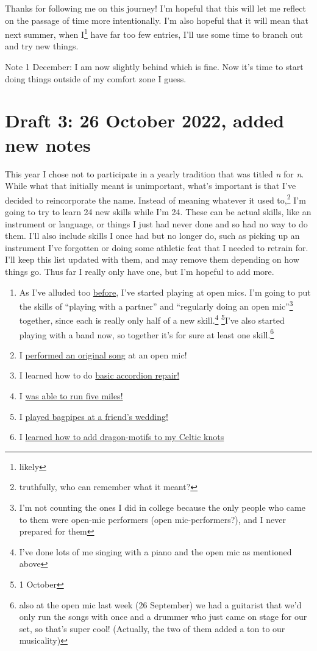 \documentclass[12pt]{article}[titlepage]
\newcommand{\say}[1]{``#1''}
\newcommand{\1}{\={a}}
\newcommand{\2}{\={e}}
\newcommand{\3}{\={\i}}
\newcommand{\4}{\=o}
\newcommand{\5}{\=u}
\newcommand{\6}{\={A}}
\renewcommand{\,}{\textsuperscript{,}}
\begin{document}
Thanks for following me on this journey!
I'm hopeful that this will let me reflect on the passage of time more intentionally.
I'm also hopeful that it will mean that next summer, when I\footnote{likely} have far too few entries, I'll use some time to branch out and try new things.

Note 1 December: I am now slightly behind which is fine.
Now it's time to start doing things outside of my comfort zone I guess.


\section{Draft 3: 26 October 2022, added new notes}
This year I chose not to participate in a yearly tradition that was titled \textit{n} for \textit{n}.
While what that initially meant is unimportant, what's important is that I've decided to reincorporate the name.
Instead of meaning whatever it used to,\footnote{truthfully, who can remember what it meant?} I'm going to try to learn 24 new skills while I'm 24.
These can be actual skills, like an instrument or language, or things I just had never done and so had no way to do them.
I'll also include skills I once had but no longer do, such as picking up an instrument I've forgotten or doing some athletic feat that I needed to retrain for.
I'll keep this list updated with them, and may remove them depending on how things go.
Thus far I really only have one, but I'm hopeful to add more.

\begin{enumerate}
\item As I've alluded too \href{open-mic-2.html}{before}, I've started playing at open mics.
I'm going to put the skills of \say{playing with a partner} and \say{regularly doing an open mic}\footnote{I'm not counting the ones I did in college because the only people who came to them were open-mic performers (open mic-performers?), and I never prepared for them} together, since each is really only half of a new skill.\footnote{I've done lots of me singing with a piano and the open mic as mentioned above} \footnote{1 October}I've also started playing with a band now, so together it's for sure at least one skill.\footnote{also at the open mic last week (26 September) we had a guitarist that we'd only run the songs with once and a drummer who just came on stage for our set, so that's super cool! (Actually, the two of them added a ton to our musicality)}
\item I \href{performing-a-song.html}{performed an original song} at an open mic!
\item I learned how to do \href{accordion-repair.html}{basic accordion repair!}
\item I \href{running-2.html}{was able to run five miles!} 
\item I \href{bagpipes.html}{played bagpipes at a friend's wedding!}
\item I \href{celtic-knots.html}{learned how to add dragon-motifs to my Celtic knots}
\end{enumerate}
\end{document}
